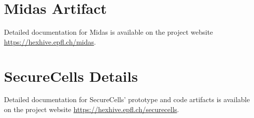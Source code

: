 \documentclass[lablogo]{thesis}
\newcommand{\seccells}{SecureCells\xspace}
\newcommand{\midas}{Midas\xspace}
\begin{document}
\begin{appendices}

\chapter{\midas Artifact}

Detailed documentation for \midas is available on the project website 
\url{https://hexhive.epfl.ch/midas}.



\chapter{\seccells Details}

Detailed documentation for \seccells{}' prototype and code artifacts is
available on the project website \url{https://hexhive.epfl.ch/securecells}.


\end{appendices}

\backmatter


{}

\end{document}
